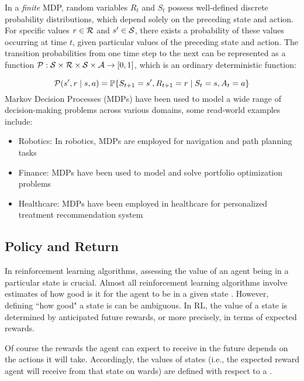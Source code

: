In a \textit{finite} MDP, random variables $R_t$ and $S_t$ possess well-defined discrete probability distributions, which depend solely on the preceding state and action. For specific values $r \in \mathcal R$ and $s' \in \mathcal{S}$, there exists a probability of these values occurring at time $t$, given particular values of the preceding state and action. The transition probabilities from one time step to the next can be represented as a function $\mathcal P: \mathcal{S} \times \mathcal R \times 
\mathcal{S} \times \mathcal A \to [0,1]$, which is an ordinary deterministic function\cite{RL}:

\begin{equation}
    \mathcal P(s', r \mid s, a) = \mathbb{P}\{S_{t+1} = s', R_{t+1} = r \mid S_t = s, A_t = a\}
\end{equation}
Markov Decision Processes (MDPs) have been used to model a wide range of decision-making problems across various domains, some read-world examples include:
\begin{itemize}
    \item Robotics: In robotics, MDPs are employed for navigation and path planning tasks \cite{thrun2005}
    \item Finance: MDPs have been used to model and solve portfolio optimization problems \cite{buehler2019}
    \item Healthcare: MDPs have been employed in healthcare for personalized treatment recommendation system 
    \cite{komorowski2018}
\end{itemize}

\subsection{Policy and Return}
In reinforcement learning algorithms, assessing the value of an agent being in a particular state is crucial. 
Almost all reinforcement learning algorithms involve estimates of how good is it for the agent to be in a given state \cite{RL}.
However, defining ``how good" a state is can be ambiguous. In RL, the value of a state is determined by anticipated future rewards, or more precisely, in terms of expected rewards.

Of course the rewards the agent can expect to receive in the future depends on the actions it will take. Accordingly, the values of states (i.e., the expected reward agent will receive from that state on wards) are defined with respect to a .

